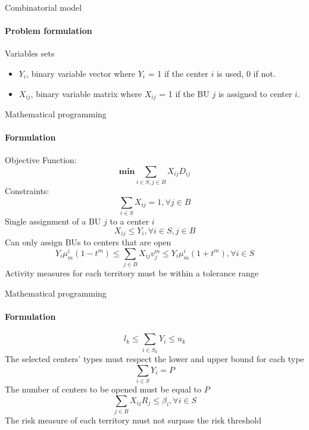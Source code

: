 \documentclass{beamer}
\begin{document}
\begin{frame}{Combinatorial model}
    \framesubtitle{Problem formulation}
        Variables sets
        \begin{itemize}
            \item \small $Y_i$, binary variable vector where $Y_i$ = 1 if the center $i$ is used, 0 if not.
            \item \small $X_{ij}$, binary variable matrix where $X_{ij}$ = 1 if the BU $j$ is assigned to center $i$.
        \end{itemize}
\end{frame}

        


\begin{frame}{Mathematical programming}
    \framesubtitle{Formulation}
    Objective Function:
    \begin{equation}
        \mathbf{min}\sum_{i \in S, j \in B}{X_{ij} D_{ij}}
    \end{equation}{}
    Constraints:
    \begin{equation}
       \sum_{i \in S} X_{ij} = 1, \forall j \in B
    \end{equation}{}
    \centering \small Single assignment of a BU $j$ to a center $i$
    \begin{equation}
        X_{ij} \le Y_i, \forall i \in S, j \in B
    \end{equation}{}
    Can only assign BUs to centers that are open
    \begin{equation}
        Y_i\mu_m^i(1-t^m) \le \sum_{j\in B}X_{ij}v_j^m \le Y_i\mu_m^i(1+t^m), \forall i \in S
    \end{equation}{}
    Activity measures for each territory must be within a tolerance range
\end{frame}

\begin{frame}{Mathematical programming}
    \framesubtitle{Formulation}
    \begin{equation}
        l_k \le \sum_{i \in S_k} Y_i \le u_k
    \end{equation}{}
    The selected centers' types must respect the lower and upper bound for each type
    \begin{equation}
        \sum_{i \in S} Y_i = P
    \end{equation}{}
    The number of centers to be opened must be equal to $P$
    \begin{equation}
        \sum_{j \in B}X_{ij}R_j \le \beta_i, \forall i \in S
    \end{equation}{}
    The risk measure of each territory must not surpass the risk threshold
\end{frame}
\end{document}
